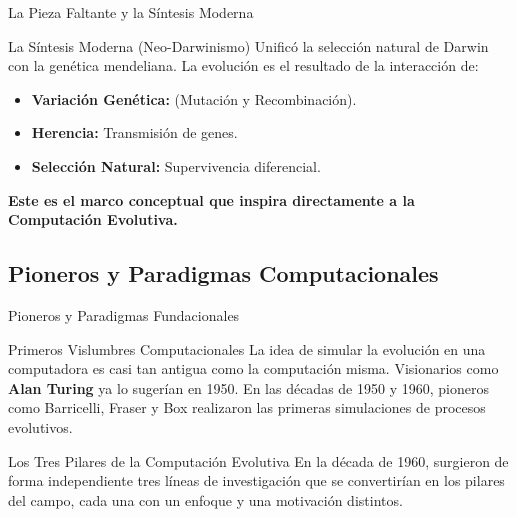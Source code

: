\documentclass[aspectratio=169,xcolor=dvipsnames]{beamer}
\begin{document}
\begin{frame}{La Pieza Faltante y la Síntesis Moderna}

    \begin{block}{La Síntesis Moderna (Neo-Darwinismo)}
    Unificó la selección natural de Darwin con la genética mendeliana. La evolución es el resultado de la interacción de:
    \begin{itemize}
        \item \textbf{Variación Genética:} (Mutación y Recombinación).
        \item \textbf{Herencia:} Transmisión de genes.
        \item \textbf{Selección Natural:} Supervivencia diferencial.
    \end{itemize}
    \textbf{Este es el marco conceptual que inspira directamente a la Computación Evolutiva.}
    \end{block}
\end{frame}

\subsection{Pioneros y Paradigmas Computacionales}

\begin{frame}{Pioneros y Paradigmas Fundacionales}
    \begin{block}{Primeros Vislumbres Computacionales}
    La idea de simular la evolución en una computadora es casi tan antigua como la computación misma. Visionarios como \textbf{Alan Turing} ya lo sugerían en 1950. En las décadas de 1950 y 1960, pioneros como Barricelli, Fraser y Box realizaron las primeras simulaciones de procesos evolutivos.
    \end{block}
    
    \begin{alertblock}{Los Tres Pilares de la Computación Evolutiva}
    En la década de 1960, surgieron de forma independiente tres líneas de investigación que se convertirían en los pilares del campo, cada una con un enfoque y una motivación distintos.
    \end{alertblock}
\end{frame}

\end{document}
